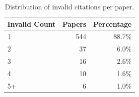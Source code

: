 \begin{table}[t]
\centering
\caption{Distribution of invalid citations per paper.}
\label{tab:invalid_per_paper}
\small
\begin{tabular}{lrr}
\toprule
\textbf{Invalid Count} & \textbf{Papers} & \textbf{Percentage} \\
\midrule
\cellcolor{red!10}1 & \cellcolor{red!10}544 & \cellcolor{red!10}88.7\% \\
\cellcolor{red!20}2 & \cellcolor{red!20}37 & \cellcolor{red!20}6.0\% \\
\cellcolor{red!30}3 & \cellcolor{red!30}16 & \cellcolor{red!30}2.6\% \\
\cellcolor{red!40}4 & \cellcolor{red!40}10 & \cellcolor{red!40}1.6\% \\
\cellcolor{red!50}5+ & \cellcolor{red!50}6 & \cellcolor{red!50}1.0\% \\
\bottomrule
\end{tabular}
\end{table}

